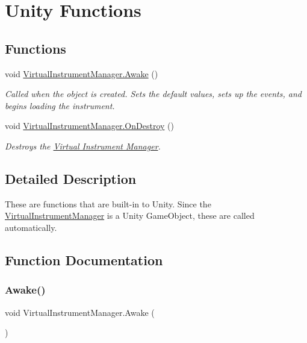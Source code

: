 \hypertarget{group___v_i_m_unity}{}\section{Unity Functions}
\label{group___v_i_m_unity}
\subsection*{Functions}
\begin{DoxyCompactItemize}
\item 
void \hyperlink{group___v_i_m_unity_gab92bac4e22476ffe39fc40f49fbd6ae5}{Virtual\+Instrument\+Manager.\+Awake} ()
\begin{DoxyCompactList}\small\item\em Called when the object is created. Sets the default values, sets up the events, and begins loading the instrument. \end{DoxyCompactList}\item 
void \hyperlink{group___v_i_m_unity_ga87f2b8783dc03eac75819c3ace35f880}{Virtual\+Instrument\+Manager.\+On\+Destroy} ()
\begin{DoxyCompactList}\small\item\em Destroys the \hyperlink{group___v_i_m}{Virtual Instrument Manager}. \end{DoxyCompactList}\end{DoxyCompactItemize}


\subsection{Detailed Description}
These are functions that are built-\/in to Unity. Since the \hyperlink{class_virtual_instrument_manager}{Virtual\+Instrument\+Manager} is a Unity Game\+Object, these are called automatically. 

\subsection{Function Documentation}
\mbox{\label{group___v_i_m_unity_gab92bac4e22476ffe39fc40f49fbd6ae5}} 
\subsubsection{\texorpdfstring{Awake()}{Awake()}}
{\footnotesize\ttfamily void Virtual\+Instrument\+Manager.\+Awake (\begin{DoxyParamCaption}{ }\end{DoxyParamCaption})}




